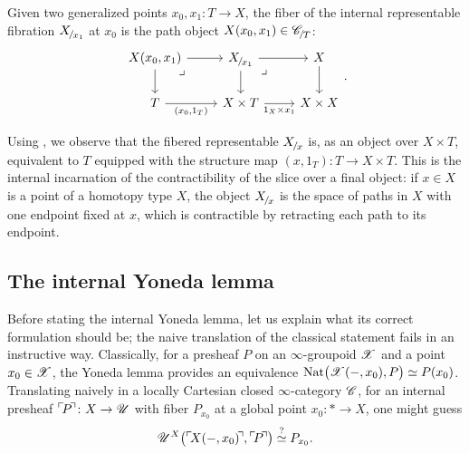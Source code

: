 \documentclass[twoside,a4paper,11pt]{amsart}
\begin{document}
\begin{remark}\label{Notation: Path space between two point in X}
    Given two generalized points $x_0,x_1\colon T\to X$, the fiber of the internal representable fibration $\slice{X}{x_1}$ at $x_0$ is the path object $X(x_0,x_1)\in\slice{\C}{T}$:
\[\begin{tikzcd}
	X(x_0,x_1) \arrow[r] \arrow[d] \arrow[dr, phantom, "\lrcorner", very near start] & \slice{X}{x_1}\arrow[dr, phantom, "\lrcorner", very near start] \arrow[r] \arrow[d] & X \arrow[d] \\
	T \arrow[r, "{(x_0,1_T)}"'] & X \times T \arrow[r, "{1_X \times x_1}"'] & X \times X
\end{tikzcd}.\]
\end{remark}
\begin{remark}\label{remark: Fibered representable is T}
     Using , we observe that the fibered representable $\slice{X}{x}$ is, as an object over $X\times T$, equivalent to $T$ equipped with the structure map $(x,1_T)\colon T\to X\times T$. This is the internal incarnation of the contractibility of the slice over a final object: if $x\in X$ is a point of a homotopy type $X$, the object $\slice{X}{x}$ is the space of paths in $X$ with one endpoint fixed at $x$, which is contractible by retracting each path to its endpoint.
\end{remark}
\subsection{The internal Yoneda lemma}\label{subsection: yoneda lemma}
Before stating the internal Yoneda lemma, let us explain what its correct formulation should be; the naive translation of the classical statement fails in an instructive way. Classically, for a presheaf $P$ on an $\infty$-groupoid $\mathscr{X}$ and a point $x_0\in \mathscr{X}$, the Yoneda lemma provides an equivalence $\mathrm{Nat}\big(\mathscr{X}(-,x_0),P\big)\simeq P(x_0)$. Translating naively in a locally Cartesian closed $\infty$-category $\mathscr{C}$, for an internal presheaf $\corner{P}\colon X\to\U$ with fiber $P_{x_0}$ at a global point $x_0\colon \ast\to X$, one might guess
\[\U^X\big(\corner{X(-,x_0)},\corner{P}\big)\overset{?}{\simeq} P_{x_0}.\]
\end{document}
